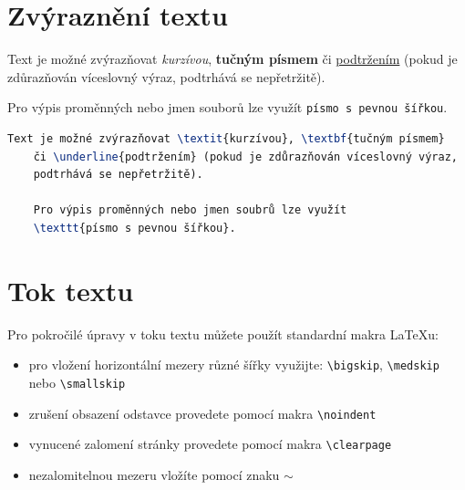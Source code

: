 \clearpage

\section{Zvýraznění textu}

  Text je možné zvýrazňovat \textit{kurzívou}, \textbf{tučným písmem} či \underline{podtržením} (pokud je zdůrazňován víceslovný výraz, podtrhává se nepřetržitě).
  
  Pro výpis proměnných nebo jmen souborů lze využít \texttt{písmo s pevnou šířkou}.

\begin{lstlisting}[caption={Příklad zvýraznění textu},label=list:8-6,captionpos=t,abovecaptionskip=-\medskipamount,belowcaptionskip=\medskipamount,language=TeX]
    Text je možné zvýrazňovat \textit{kurzívou}, \textbf{tučným písmem} 
    či \underline{podtržením} (pokud je zdůrazňován víceslovný výraz,
    podtrhává se nepřetržitě).
    
    Pro výpis proměnných nebo jmen soubrů lze využít 
    \texttt{písmo s pevnou šířkou}.
\end{lstlisting}

\section{Tok textu}

Pro pokročilé úpravy v toku textu můžete použít standardní makra \LaTeX{}u:

\begin{itemize}
  \item pro vložení horizontální mezery různé šířky využijte: \texttt{\textbackslash bigskip}, \texttt{\textbackslash medskip} nebo \texttt{\textbackslash smallskip}
  \item zrušení obsazení odstavce provedete pomocí makra \texttt{\textbackslash noindent}
  \item vynucené zalomení stránky provedete pomocí makra \texttt{\textbackslash clearpage}
  \item nezalomitelnou mezeru vložíte pomocí znaku \texttt{$\sim$}
\end{itemize}

\clearpage

